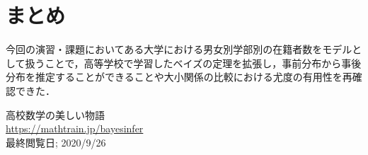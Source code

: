 \documentclass[12pt]{jarticle}
\begin{document}
\section{まとめ}
今回の演習・課題においてある大学における男女別学部別の在籍者数をモデルとして扱うことで，高等学校で学習したベイズの定理を拡張し，事前分布から事後分布を推定することができることや大小関係の比較における尤度の有用性を再確認できた．

\begin{thebibliography}{99}
    \label{sannkoubunnkenn_chapter}
    \bibitem{} 高校数学の美しい物語\\
    \url{https://mathtrain.jp/bayesinfer}\\
    最終閲覧日; 2020/9/26
\end{thebibliography}

\end{document}
